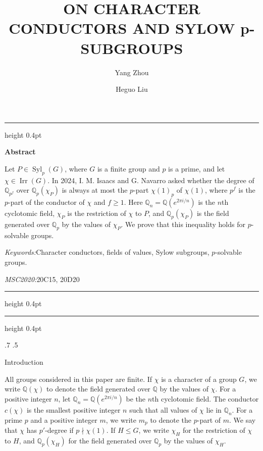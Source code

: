 \documentclass[reqno]{amsart}
\makeatletter
\theoremstyle{definition}
\theoremstyle{remark}
\renewcommand{\baselinestretch}{1.3}\normalsize
\numberwithin{equation}{section}
\DeclareMathOperator{\Irr}{Irr}
\DeclareMathOperator{\Syl}{Syl}
\theoremstyle{plain}
\renewcommand{\section}{%
  \@startsection{section}{1}{\z@}%
    {.7\linespacing\@plus\linespacing}%
    {.5\linespacing}%
    {\normalfont\bfseries\raggedright
     \let\@secnumfont\bfseries}%
}
\makeatother
\begin{document}
\raggedbottom
\title{ON CHARACTER CONDUCTORS AND SYLOW
p-SUBGROUPS}
\author{Yang Zhou}
\author{Heguo Liu}



\maketitle

\noindent
\begin{minipage}{\textwidth}
\renewcommand{\baselinestretch}{1}
\normalfont\normalsize
\setlength{\parindent}{0pt}
\setlength{\parskip}{0pt}

\hrule height 0.4pt
\vspace{0.6em}

\textbf{Abstract}\par
\vspace{0.4em}


Let $P\in\Syl_p(G)$, where $G$ is a finite group and $p$ is a prime,
and let $\chi\in\Irr(G)$. In 2024, I. M. Isaacs and G. Navarro
asked whether the degree of $\mathbb{Q}_{p^f}$ over
$\mathbb{Q}_p(\chi_P)$ is always at most the $p$-part
$\chi(1)_p$ of $\chi(1)$, where $p^f$ is the $p$-part of the
conductor of $\chi$ and $f\geq1$. Here
$\mathbb{Q}_n=\mathbb{Q}(e^{2\pi i/n})$ is the $n$th cyclotomic
field, $\chi_P$ is the restriction of $\chi$ to $P$, and
$\mathbb{Q}_p(\chi_P)$ is the field generated over
$\mathbb{Q}_p$ by the values of $\chi_P$.
We prove that this inequality holds for $p$-solvable groups.
\par\medskip

\textit{Keywords:}\quad Character conductors, fields of values,
Sylow subgroups, $p$-solvable groups.
\par
\textit{MSC2020:}\quad 20C15, 20D20
\par\vspace{0.6em}

\hrule height 0.4pt

\hrule height 0.4pt
\end{minipage}
\par\medskip

\Large



\section{Introduction}

All groups considered in this paper are finite.
If $\chi$ is a character of a group $G$, we write
$\mathbb{Q}(\chi)$ to denote the field generated over $\mathbb{Q}$
by the values of $\chi$.
For a positive integer $n$, let
$\mathbb{Q}_n=\mathbb{Q}(e^{2\pi i/n})$ be the $n$th cyclotomic field.
The conductor $c(\chi)$ is the smallest positive integer $n$ such
that all values of $\chi$ lie in $\mathbb{Q}_n$.
For a prime $p$ and a positive integer $m$, we write $m_p$ to denote
the $p$-part of $m$. We say that $\chi$ has $p'$-degree if $p\nmid\chi(1)$.
If $H\leq G$, we write $\chi_H$ for the restriction of $\chi$ to $H$,
and $\mathbb{Q}_p(\chi_H)$ for the field generated over
$\mathbb{Q}_p$ by the values of $\chi_H$.
\end{document}
